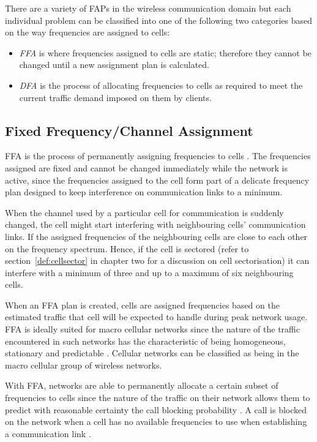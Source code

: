 There are a variety of \gls{FAP}s in the wireless communication domain but each individual problem can be classified into one of the following two categories based on the way frequencies are assigned to cells:
\begin{itemize}
  \item \emph{\gls{FFA}} is where frequencies assigned to cells are static; therefore they cannot be changed until a new assignment plan is calculated\cite{PrinciplesMobileCommunication}.
\item \emph{\gls{DFA}} is the process of allocating frequencies to cells as required to meet the current traffic demand imposed on them by clients\cite{PrinciplesMobileCommunication}. 
\end{itemize}

\subsection{Fixed Frequency/Channel Assignment}
\gls{FFA} is the process of permanently assigning frequencies to cells \cite{PrinciplesMobileCommunication}. The frequencies assigned are fixed and cannot be changed immediately while the network is active, since the frequencies assigned to the cell form part of a delicate frequency plan designed to keep interference on communication links to a minimum\cite{PrinciplesMobileCommunication}. 

When the channel used by a particular cell for communication is suddenly changed, the cell might start interfering with neighbouring cells' communication links. If the assigned frequencies of the neighbouring cells are close to each other on the frequency spectrum. Hence, if the cell is sectored (refer to section~\ref{def:cellsector} in chapter two for a discussion on cell sectorisation) it can interfere with a minimum of three and up to a maximum of six neighbouring cells\cite{PrinciplesMobileCommunication}.

When an \gls{FFA} plan is created, cells are assigned frequencies based on the estimated traffic that cell will be expected to handle during peak network usage. \gls{FFA} is ideally suited for macro cellular networks since the nature of the traffic encountered in such networks has the characteristic of being homogeneous, stationary and predictable \cite{PrinciplesMobileCommunication}. Cellular networks can be classified as being in the macro cellular group of wireless networks.

With \gls{FFA}, networks are able to permanently allocate a certain subset of frequencies to cells since the nature of the traffic on their network allows them to predict with reasonable certainty the call blocking probability \cite{PrinciplesMobileCommunication}. A call is blocked on the network when a cell has no available frequencies to use when establishing a communication link \cite{PrinciplesMobileCommunication}.

